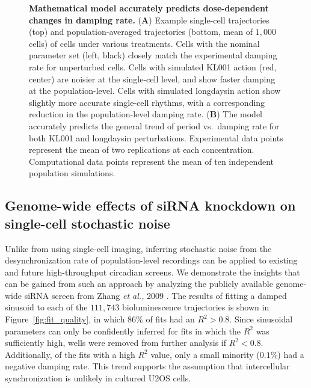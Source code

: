 \documentclass[11pt, letterpaper]{article}
\begin{document}
\begin{figure}[tbp]
  \begin{center}
  \end{center}
  \caption{{\bfseries Mathematical model accurately predicts dose-dependent changes in damping rate.}
({\bfseries A}) Example single-cell trajectories (top) and population-averaged trajectories (bottom, mean of $1,000$ cells) of cells under various treatments. Cells with the nominal parameter set (left, black) closely match the experimental damping rate for unperturbed cells. Cells with simulated KL001 action (red, center) are noisier at the single-cell level, and show faster damping at the population-level. Cells with simulated longdaysin action show slightly more accurate single-cell rhythms, with a corresponding reduction in the population-level damping rate.
({\bfseries B}) The model accurately predicts the general trend of period vs.\ damping rate for both KL001 and longdaysin perturbations. Experimental data points represent the mean of two replications at each concentration. Computational data points represent the mean of ten independent population simulations.}
\label{fig:simulation}
\end{figure}


\subsection*{Genome-wide effects of siRNA knockdown on single-cell stochastic noise}

Unlike from using single-cell imaging, inferring stochastic noise from the desynchronization rate of population-level recordings can be applied to existing and future high-throughput circadian screens.
We demonstrate the insights that can be gained from such an approach by analyzing the publicly available genome-wide siRNA screen from Zhang {\itshape et al.,} 2009 \cite{Zhang2009}.
The results of fitting a damped sinusoid to each of the $111,743$ bioluminescence trajectories is shown in Figure~\ref{fig:fit_quality}, in which $86\%$ of fits had an $R^2 > 0.8$.
Since sinusoidal parameters can only be confidently inferred for fits in which the $R^2$ was sufficiently high, wells were removed from further analysis if $R^2 < 0.8$.
Additionally, of the fits with a high $R^2$ value, only a small minority ($0.1\%$) had a negative damping rate.
This trend supports the assumption that intercellular synchronization is unlikely in cultured U2OS cells. 
\end{document}
